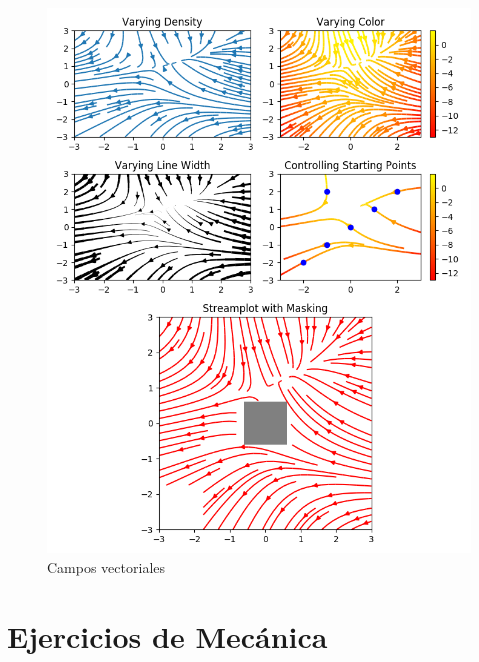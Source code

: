 \begin{frame}
\begin{figure}
{	\includegraphics[scale=0.4]{Imagenes/sphx_glr_plot_streamplot_001.png}
	\caption{Campos vectoriales}
	}
\end{figure}
\end{frame}
\section{Ejercicios de Mecánica}
